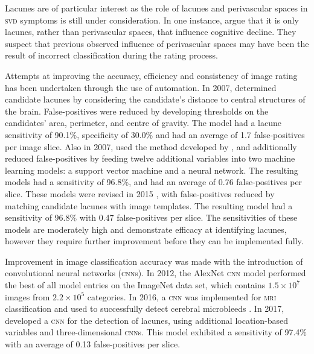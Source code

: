 Lacunes are of particular interest as the role of lacunes and perivascular spaces in \textsc{svd} symptoms is still under consideration. In one instance, \cite{BenjaminJ.Philip2018LIbN} argue that it is only lacunes, rather than perivascular spaces, that influence cognitive decline. They suspect that previous observed influence of perivascular spaces may have been the result of incorrect classification during the rating process.

Attempts at improving the accuracy, efficiency and consistency of image rating has been undertaken through the use of automation. In 2007, \cite{Yokoyama2007} determined candidate lacunes by considering the candidate's distance to central structures of the brain. False-positives were reduced by developing thresholds on the candidates' area, perimeter, and centre of gravity. The model had a lacune sensitivity of 90.1\%, specificity of 30.0\% and had an average of 1.7 false-positives per image slice. Also in 2007, \cite{Uchiyama20071554, Uchiyama2007b} used the method developed by \cite{Yokoyama2007}, and additionally reduced false-positives by feeding twelve additional variables into two machine learning models: a support vector machine and a neural network. The resulting models had a sensitivity of 96.8\%, and had an average of 0.76 false-positives per slice. These models were revised in 2015 \citep{Uchiyama2015}, with false-positives reduced by matching candidate lacunes with image templates. The resulting model had a sensitivity of 96.8\% with 0.47 false-positives per slice. The sensitivities of these models are moderately high and demonstrate efficacy at identifying lacunes, however they require further improvement before they can be implemented fully.

Improvement in image classification accuracy was made with the introduction of convolutional neural networks (\textsc{cnn}s). In 2012, the AlexNet \textsc{cnn} model \citep{AlexNet2012} performed the best of all model entries on the ImageNet data set, which contains $1.5\times10^{7}$ images from $2.2\times10^5$ categories. In 2016, a \textsc{cnn} was implemented for \textsc{mri} classification and used to successfully detect cerebral microbleeds \citep{DouQ.2016ADoC}. In 2017, \cite{GhafoorianM.2017Dml3} developed a \textsc{cnn} for the detection of lacunes, using additional location-based variables and three-dimensional \textsc{cnn}s. This model exhibited a sensitivity of 97.4\% with an average of 0.13 false-positives per slice.

